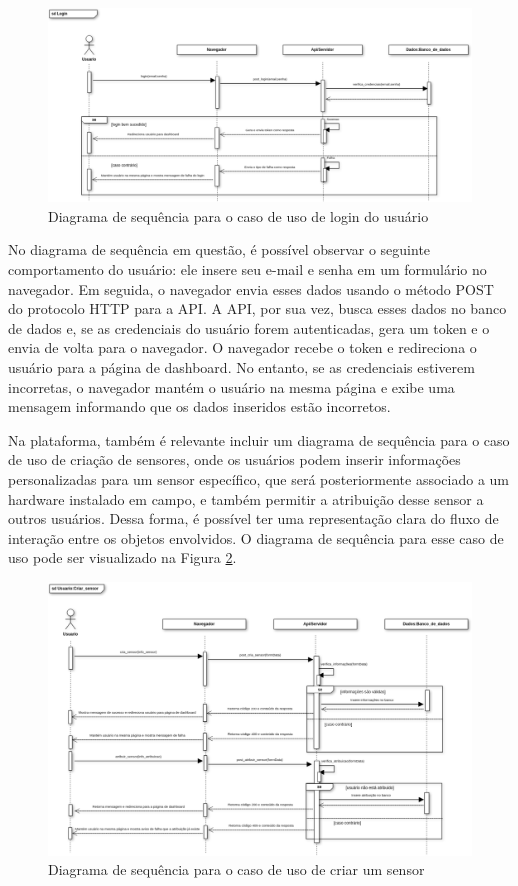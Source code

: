 \documentclass[tcc,capa]{texufpel}
\begin{document}
\begin{figure}[htbp]
  \centering \includegraphics[scale=.3]{assets/sdlogin.png}
  \caption{Diagrama de sequência para o caso de uso de login do usuário}
  \label{sdlogin}
\end{figure}
No diagrama de sequência em questão, é possível observar o seguinte comportamento do usuário: ele insere seu e-mail e senha em um formulário no navegador. Em seguida, o navegador envia esses dados usando o método POST do protocolo HTTP para a API. A API, por sua vez, busca esses dados no banco de dados e, se as credenciais do usuário forem autenticadas, gera um token e o envia de volta para o navegador. O navegador recebe o token e redireciona o usuário para a página de dashboard. No entanto, se as credenciais estiverem incorretas, o navegador mantém o usuário na mesma página e exibe uma mensagem informando que os dados inseridos estão incorretos.

Na plataforma, também é relevante incluir um diagrama de sequência para o caso de uso de criação de sensores, onde os usuários podem inserir informações personalizadas para um sensor específico, que será posteriormente associado a um hardware instalado em campo, e também permitir a atribuição desse sensor a outros usuários. Dessa forma, é possível ter uma representação clara do fluxo de interação entre os objetos envolvidos. O diagrama de sequência para esse caso de uso pode ser visualizado na Figura \ref{sdcriar_sensor}.

\begin{figure}[htbp]
  \centering \includegraphics[scale=.3]{assets/sdcriar_sensor.png}
  \caption{Diagrama de sequência para o caso de uso de criar um sensor}
  \label{sdcriar_sensor}
\end{figure}
\newpage
\end{document}
